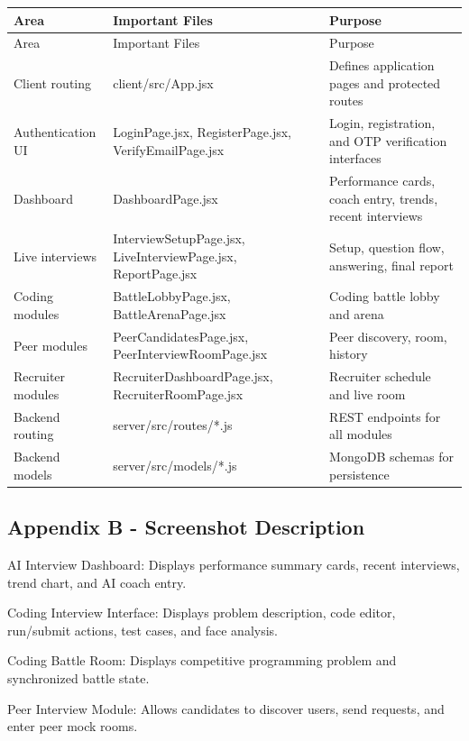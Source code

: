\documentclass[12pt,a4paper]{report}
\begin{document}
\begin{longtable}{|>{\raggedright\arraybackslash}p{}|>{\raggedright\arraybackslash}p{}|>{\raggedright\arraybackslash}p{}|}
\hline
Area & Important Files & Purpose \\
\hline
\endfirsthead
\hline
Area & Important Files & Purpose \\
\hline
\endhead
Client routing & client/src/App.jsx & Defines application pages and protected routes \\
\hline
Authentication UI & LoginPage.jsx, RegisterPage.jsx, VerifyEmailPage.jsx & Login, registration, and OTP verification interfaces \\
\hline
Dashboard & DashboardPage.jsx & Performance cards, coach entry, trends, recent interviews \\
\hline
Live interviews & InterviewSetupPage.jsx, LiveInterviewPage.jsx, ReportPage.jsx & Setup, question flow, answering, final report \\
\hline
Coding modules & BattleLobbyPage.jsx, BattleArenaPage.jsx & Coding battle lobby and arena \\
\hline
Peer modules & PeerCandidatesPage.jsx, PeerInterviewRoomPage.jsx & Peer discovery, room, history \\
\hline
Recruiter modules & RecruiterDashboardPage.jsx, RecruiterRoomPage.jsx & Recruiter schedule and live room \\
\hline
Backend routing & server/src/routes/*.js & REST endpoints for all modules \\
\hline
Backend models & server/src/models/*.js & MongoDB schemas for persistence \\
\hline
\end{longtable}

\subsection{Appendix B - Screenshot Description}

AI Interview Dashboard: Displays performance summary cards, recent interviews, trend chart, and AI coach entry.


Coding Interview Interface: Displays problem description, code editor, run/submit actions, test cases, and face analysis.


Coding Battle Room: Displays competitive programming problem and synchronized battle state.


Peer Interview Module: Allows candidates to discover users, send requests, and enter peer mock rooms.
\end{document}
